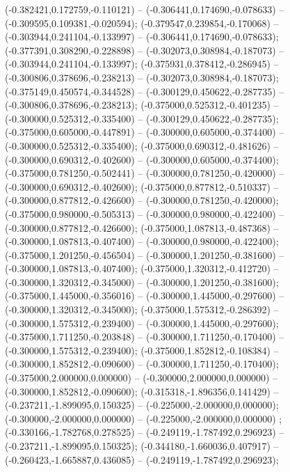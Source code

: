  (-0.382421,0.172759,-0.110121) -- (-0.306441,0.174690,-0.078633) -- (-0.309595,0.109381,-0.020594);
 (-0.379547,0.239854,-0.170068) -- (-0.303944,0.241104,-0.133997) -- (-0.306441,0.174690,-0.078633);
 (-0.377391,0.308290,-0.228898) -- (-0.302073,0.308984,-0.187073) -- (-0.303944,0.241104,-0.133997);
 (-0.375931,0.378412,-0.286945) -- (-0.300806,0.378696,-0.238213) -- (-0.302073,0.308984,-0.187073);
 (-0.375149,0.450574,-0.344528) -- (-0.300129,0.450622,-0.287735) -- (-0.300806,0.378696,-0.238213);
 (-0.375000,0.525312,-0.401235) -- (-0.300000,0.525312,-0.335400) -- (-0.300129,0.450622,-0.287735);
 (-0.375000,0.605000,-0.447891) -- (-0.300000,0.605000,-0.374400) -- (-0.300000,0.525312,-0.335400);
 (-0.375000,0.690312,-0.481626) -- (-0.300000,0.690312,-0.402600) -- (-0.300000,0.605000,-0.374400);
 (-0.375000,0.781250,-0.502441) -- (-0.300000,0.781250,-0.420000) -- (-0.300000,0.690312,-0.402600);
 (-0.375000,0.877812,-0.510337) -- (-0.300000,0.877812,-0.426600) -- (-0.300000,0.781250,-0.420000);
 (-0.375000,0.980000,-0.505313) -- (-0.300000,0.980000,-0.422400) -- (-0.300000,0.877812,-0.426600);
 (-0.375000,1.087813,-0.487368) -- (-0.300000,1.087813,-0.407400) -- (-0.300000,0.980000,-0.422400);
 (-0.375000,1.201250,-0.456504) -- (-0.300000,1.201250,-0.381600) -- (-0.300000,1.087813,-0.407400);
 (-0.375000,1.320312,-0.412720) -- (-0.300000,1.320312,-0.345000) -- (-0.300000,1.201250,-0.381600);
 (-0.375000,1.445000,-0.356016) -- (-0.300000,1.445000,-0.297600) -- (-0.300000,1.320312,-0.345000);
 (-0.375000,1.575312,-0.286392) -- (-0.300000,1.575312,-0.239400) -- (-0.300000,1.445000,-0.297600);
 (-0.375000,1.711250,-0.203848) -- (-0.300000,1.711250,-0.170400) -- (-0.300000,1.575312,-0.239400);
 (-0.375000,1.852812,-0.108384) -- (-0.300000,1.852812,-0.090600) -- (-0.300000,1.711250,-0.170400);
 (-0.375000,2.000000,0.000000) -- (-0.300000,2.000000,0.000000) -- (-0.300000,1.852812,-0.090600);
 (-0.315318,-1.896356,0.141429) -- (-0.237211,-1.899095,0.150325) -- (-0.225000,-2.000000,0.000000);
 (-0.300000,-2.000000,0.000000) -- (-0.225000,-2.000000,0.000000) ;
 (-0.330166,-1.782768,0.278525) -- (-0.249119,-1.787492,0.296923) -- (-0.237211,-1.899095,0.150325);
 (-0.344180,-1.660036,0.407917) -- (-0.260423,-1.665887,0.436085) -- (-0.249119,-1.787492,0.296923);
